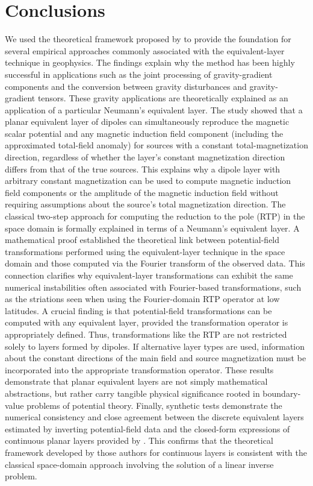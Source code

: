 \section{Conclusions}
\label{sec:conclusions}

We used the theoretical framework proposed by \cite{oliveirajr_etal2026_1}
to provide the foundation for several empirical approaches 
commonly associated with the equivalent-layer technique in geophysics. 
The findings explain why the method has been highly successful in applications such as 
the joint processing of gravity-gradient components and the conversion between gravity 
disturbances and gravity-gradient tensors. These gravity applications are theoretically 
explained as an application of a particular Neumann's equivalent layer.
The study showed that a planar equivalent layer of dipoles can simultaneously reproduce 
the magnetic scalar potential and any magnetic induction field component (including the 
approximated total-field anomaly) for sources with a constant total-magnetization 
direction, regardless of whether the layer's constant magnetization direction 
differs from that of the true sources. This explains why a dipole layer with arbitrary 
constant magnetization can be used to compute magnetic induction field components or 
the amplitude of the magnetic induction field without requiring assumptions about the 
source's total magnetization direction.
The classical two-step approach for computing the reduction to 
the pole (RTP) in the space domain is formally explained in terms of a Neumann’s 
equivalent layer.
A mathematical proof established the theoretical link between potential-field 
transformations performed using the equivalent-layer technique in the space domain and 
those computed via the Fourier transform of the observed data. This connection 
clarifies why equivalent-layer transformations can exhibit the same numerical 
instabilities often associated with Fourier-based transformations, such as the 
striations seen when using the Fourier-domain RTP operator at low latitudes.
A crucial finding is that potential-field transformations can be computed with any 
equivalent layer, provided the transformation operator is appropriately defined. Thus, 
transformations like the RTP are not restricted solely to layers formed by dipoles. If 
alternative layer types are used, information about the constant directions of the main 
field and source magnetization must be incorporated into the appropriate transformation 
operator.
These results demonstrate that planar equivalent layers are not simply mathematical 
abstractions, but rather carry tangible physical significance rooted in 
boundary-value problems of potential theory.
Finally, synthetic tests demonstrate the numerical consistency and close agreement between
the discrete equivalent layers estimated by inverting 
potential-field data and the closed-form expressions of continuous 
planar layers provided by \cite{oliveirajr_etal2026_1}. This confirms that the 
theoretical framework developed by those authors for continuous 
layers is consistent with the classical space-domain approach involving the solution of 
a linear inverse problem.